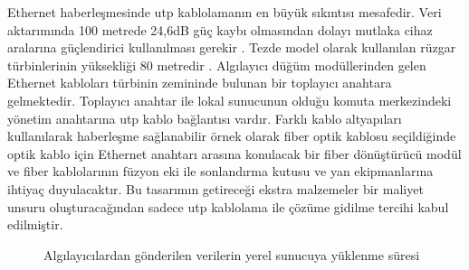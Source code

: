 Ethernet haberleşmesinde \gls{utp} kablolamanın en büyük sıkıntısı mesafedir. 
Veri aktarımında 100 metrede 24,6dB güç kaybı olmasından dolayı mutlaka cihaz aralarına güçlendirici kullanılması gerekir \cite{yilmazanalysis}. Tezde model olarak kullanılan rüzgar türbinlerinin yüksekliği 80 metredir \cite{bauer_2010}.
Algılayıcı düğüm modüllerinden gelen Ethernet kabloları türbinin zemininde bulunan bir toplayıcı anahtara gelmektedir. Toplayıcı anahtar ile lokal sunucunun olduğu komuta merkezindeki yönetim anahtarına \gls{utp} kablo bağlantısı vardır. Farklı kablo altyapıları kullanılarak haberleşme sağlanabilir örnek olarak fiber optik kablosu seçildiğinde optik kablo için Ethernet anahtarı arasına konulacak bir fiber dönüştürücü modül ve fiber kablolarının füzyon eki ile sonlandırma kutusu ve yan ekipmanlarına ihtiyaç duyulacaktır. Bu tasarımın getireceği ekstra malzemeler bir maliyet unsuru oluşturacağından sadece \gls{utp} kablolama ile çözüme gidilme tercihi kabul edilmiştir.

\begin{figure}[htbp]
\centering



\caption{Algılayıcılardan gönderilen verilerin yerel sunucuya yüklenme süresi}
\label{fig:4-13}
\end{figure}


